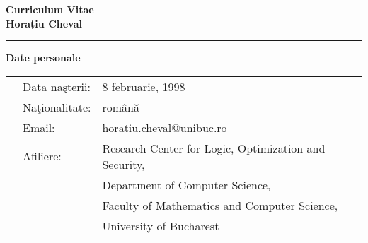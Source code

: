 \documentclass[letterpaper,11pt,oneside]{article}
\begin{document}

\noindent  \huge{\textbf{Curriculum Vitae \\ Horațiu Cheval}}  \\
\vspace{-2ex}
\hrule
\normalsize


            

\vspace{1em}



\noindent
\Large\textbf{Date personale}
\normalsize \\[3mm]
\begin{tabular}{@{} l l l}
    &Data na\c{s}terii:& 8 februarie, 1998 \\ [2mm]
    &Na\c{t}ionalitate:& rom\^{a}n\u{a} \\ [2mm]
    &Email:& {horatiu.cheval@unibuc.ro} \\[2mm]
    &Afiliere:& Research Center for Logic, Optimization and Security, \\ 
    && Department of Computer Science, \\ 
    && Faculty of Mathematics and Computer Science, \\ 
    && University of Bucharest
\end{tabular}
\\[3mm]
\end{document}
